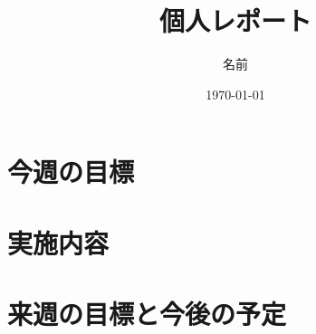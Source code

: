 \documentclass{jarticle}
\title{個人レポート}
\date{\today}
\author{名前}
\begin{document}
\maketitle
\section{今週の目標}
\section{実施内容}
\section{来週の目標と今後の予定}
\end{document}
